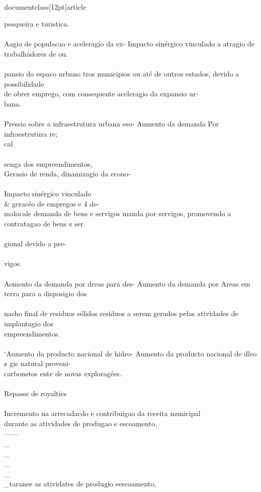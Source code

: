 \\documentclass[12pt]{article}
\begin{document}
pesqueira e turistica.\\
\\
Aagio de populacao e aceleragio da ex- Impacto sinérgico vinculado a atragio de trabalhadores de ou.\\
\\
pansio do espaco urbano tros municipios ou até de outros estados, devido a possibilidade\\
de obrer emprego, com consequente aceleragio da expansio ur-\\
bana.\\
\\
Pressio sobre a infraestrutura urbana eso- Aumento da demanda Por infraestrutura re;\\
cal\\
\\
senga dos empreendimentos,\\
Gerasio de renda, dinamizagio da econo-\\
\\
Impacto sinérgico vinculado \\& geracéo de empregos e 4 de-\\
malocale demanda de bens e servigos manda por servigos, promovendo a contratagao de bens ¢ ser.\\
\\
gional devido a pre-\\
\\
vigos.\\
\\
Aomento da demanda por dreas para des- Aumento da demanda por Areas em terra para a disposigio dos\\
\\
nacho final de residuos sélidos residuos a serem gerados pelas atividades de implantagio dos\\
empreendimentos.\\
\\
‘Aumento da producto nacional de hidro- Aumento da producto nacional de dleo ¢ gis natural proveni-\\
carbonetos ente de novas exploragées.\\
\\
Repasse de royalties\\
\\
Incremento na arrecadacdo e contribuigao da receita municipal\\
durante as atividades de produgao e escoamento,\\
——\\_\\_\\_\\_\\_taranee as atividates de produgio eescoamento,\\
\end{document}
